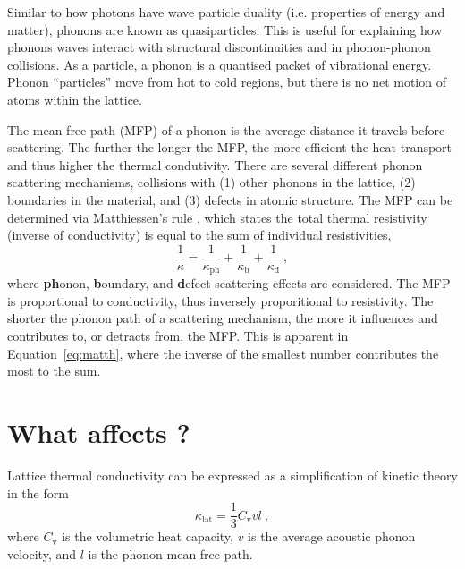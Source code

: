 Similar to how photons have wave particle duality (i.e. properties of energy and matter), phonons are known as quasiparticles. This is useful for explaining how phonons waves interact with structural discontinuities and in phonon-phonon collisions. As a particle, a phonon is a quantised packet of vibrational energy. Phonon ``particles'' move from hot to cold regions, but there is no net motion of atoms within the lattice. 

The mean free path (MFP) of a phonon is the average distance it travels before scattering. The further the longer the MFP, the more efficient the heat transport and thus higher the thermal condutivity. There are several different phonon scattering mechanisms, collisions with (1) other phonons in the lattice, (2) boundaries in the material, and (3) defects in atomic structure. The MFP can be determined via Matthiessen's rule \citep[see][]{Klemens1959}, which states the total thermal resistivity (inverse of conductivity) is equal to the sum of individual resistivities,
%
\begin{equation}
\frac{1}{\kappa} = \frac{1}{\kappa_{\mathrm{ph}}} + \frac{1}{\kappa_{\mathrm{b}}} + \frac{1}{\kappa_{\mathrm{d}}}\ ,
\label{eq:matth}
\end{equation}
%
where \textbf{ph}onon, \textbf{b}oundary, and \textbf{d}efect scattering effects are considered. The MFP is proportional to conductivity, thus inversely proporitional to resistivity. The shorter the phonon path of a scattering mechanism, the more it influences and contributes to, or detracts from, the MFP. This is apparent in Equation~\ref{eq:matth}, where the inverse of the smallest number contributes the most to the sum.






\section{What affects \tc?}

Lattice thermal conductivity can be expressed \citep[e.g.][]{Schelling2002, Stackhouse2010a} as a simplification of kinetic theory in the form 
%
\begin{equation}
\kappa_{\mathrm{lat}} = \frac{1}{3} C_{\mathrm{v}} v l\ ,
\label{eq.cvvl}
\end{equation}
%
where $C_{\mathrm{v}}$ is the volumetric heat capacity, $v$ is the average acoustic phonon velocity, and $l$ is the phonon mean free path.


